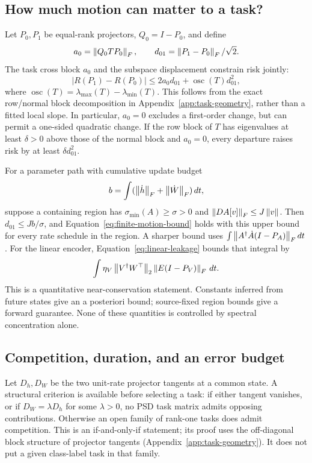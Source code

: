 \subsection{How much motion can matter to a task?}
Let $P_0,P_1$ be equal-rank projectors, $Q_0=I-P_0$, and define
\begin{equation}
 a_0=\left\lVert Q_0TP_0\right\rVert_F,\qquad d_{01}=\left\lVert P_1-P_0\right\rVert_F/\sqrt2.
\end{equation}
The task cross block $a_0$ and the subspace displacement constrain risk jointly:
\begin{equation}
 |R(P_1)-R(P_0)|\le2a_0d_{01}
 +\operatorname{osc}(T)d_{01}^2,
 \label{eq:finite-motion-bound}
\end{equation}
where $\operatorname{osc}(T)=\lambda_{\max}(T)-\lambda_{\min}(T)$. This follows from the exact row/normal block decomposition in Appendix~\ref{app:task-geometry}, rather than a fitted local slope. In particular, $a_0=0$ excludes a first-order change, but can permit a one-sided quadratic change. If the row block of $T$ has eigenvalues at least $\delta>0$ above those of the normal block and $a_0=0$, every departure raises risk by at least $\delta d_{01}^2$.

For a parameter path with cumulative update budget
\begin{equation}
 b=\int(\left\lVert \dot h\right\rVert_F+\left\lVert \dot W\right\rVert_F)\,dt,
\end{equation}
suppose a containing region has $\sigma_{\min}(A)\ge\sigma>0$ and $\left\lVert DA[v]\right\rVert_F\le J\left\lVert v\right\rVert$. Then $d_{01}\le Jb/\sigma$, and Equation~\eqref{eq:finite-motion-bound} holds with this upper bound for every rate schedule in the region. A sharper bound uses $\int\left\lVert A^\dagger\dot A(I-P_A)\right\rVert_Fdt$. For the linear encoder, Equation~\eqref{eq:linear-leakage} bounds that integral by
\begin{equation}
 \int\eta_V\left\lVert V^\dagger W^\top\right\rVert_2
              \left\lVert E(I-P_V)\right\rVert_F\,dt.
\end{equation}
This is a quantitative near-conservation statement. Constants inferred from future states give an a posteriori bound; source-fixed region bounds give a forward guarantee. None of these quantities is controlled by spectral concentration alone.

\subsection{Competition, duration, and an error budget}
Let $D_h,D_W$ be the two unit-rate projector tangents at a common state. A structural criterion is available before selecting a task: if either tangent vanishes, or if $D_W=\lambda D_h$ for some $\lambda>0$, no PSD task matrix admits opposing contributions. Otherwise an open family of rank-one tasks does admit competition. This is an if-and-only-if statement; its proof uses the off-diagonal block structure of projector tangents (Appendix~\ref{app:task-geometry}). It does not put a given class-label task in that family.

